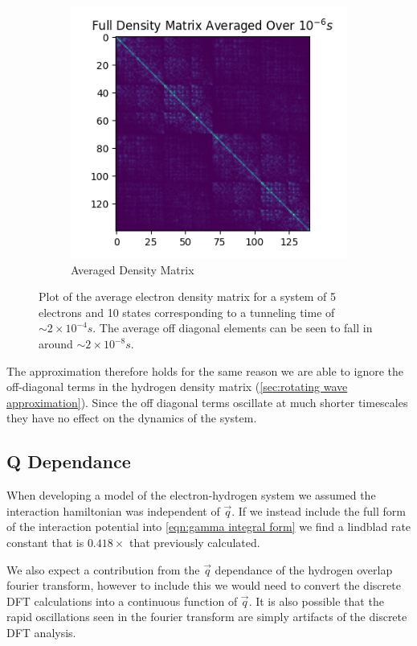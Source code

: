 \begin{figure}[htbp]
\begin{subfigure}{0.45\linewidth}
        \includegraphics[width = 0.9\linewidth]{Figures/Discussion/Full average matrix 10-6s.png} %
        \caption{Averaged Density Matrix
        }\label{sub@fig:averaged density matrix}
    \end{subfigure}
    \caption{
    Plot of the average
    electron density matrix
    for a system of 5 electrons
    and 10 states
    corresponding to a tunneling time
    of \(\sim 2\times{}10^{-4}s\).
    The average off diagonal
    elements can be seen to
    fall in around
    \(\sim 2\times{}10^{-8}s\).
    }\label{fig:density matrix analysis}
\end{figure}
The approximation
therefore holds for the
same reason we are able
to ignore the off-diagonal
terms in the hydrogen density
matrix
(\cref{sec:rotating wave approximation}).
Since
the off diagonal terms
oscillate at much shorter
timescales they have
no effect on the dynamics
of the system.

\subsection{Q Dependance}
When developing a model of
the electron-hydrogen system
we assumed the interaction
hamiltonian was independent
of \(\vec{q}\).
If we instead include the full form
of the interaction potential
into \cref{eqn:gamma integral form}
we find a
lindblad rate constant that
is \(0.418 \times{}\) that
previously calculated.

We also expect a
contribution from the
\(\vec{q}\) dependance of the hydrogen overlap
fourier transform, however
to
include this we would need to
convert the discrete
DFT calculations into a continuous
function of \(\vec{q}\).
It is also possible that
the rapid oscillations
seen in the fourier transform
are simply artifacts of the
discrete DFT analysis.

